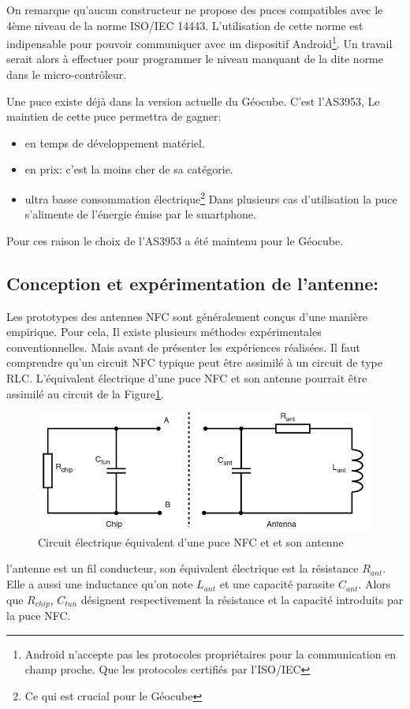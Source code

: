 \documentclass{themeensg}
\begin{document}
On remarque qu'aucun constructeur ne propose des puces compatibles avec le 4ème niveau de la norme ISO/IEC 14443. L'utilisation de cette norme est indipensable pour pouvoir communiquer avec un dispositif Android\footnote{Android n'accepte pas les protocoles propriétaires pour la communication en champ proche. Que les protocoles certifiés par l'ISO/IEC}. Un travail serait alors à effectuer pour programmer le niveau manquant de la dite norme dans le micro-contrôleur.

Une puce existe déjà dans la version actuelle du Géocube. C'est l'AS3953, Le maintien de cette puce permettra de gagner:
\begin{itemize}
\item en temps de développement matériel.
\item en prix: c'est la moins cher de sa catégorie.
\item ultra basse consommation électrique\footnote{Ce qui est crucial pour le Géocube} Dans plusieurs cas d'utilisation la puce s'alimente de l'énergie émise par le smartphone.
\end{itemize}
Pour ces raison le choix de l'AS3953 a été maintenu pour le Géocube.

\subsection{Conception et expérimentation de l'antenne:}

Les prototypes des antennes NFC sont généralement conçus d'une manière empirique. Pour cela, Il existe plusieurs méthodes expérimentales conventionnelles. Mais avant de présenter les expériences réalisées. Il faut comprendre qu'un circuit NFC typique peut être assimilé à un circuit de type RLC. L'équivalent électrique d'une puce NFC et son antenne pourrait être assimilé au circuit de la Figure\ref{fig:nfcandantenna}.

\begin{figure}[h!]
\centering
\label{fig:nfcandantenna}
\includegraphics[scale=0.5]{images/chipANDantenna.png}
\caption{Circuit électrique équivalent d'une puce NFC et et son antenne}
\end{figure}
l'antenne est un fil conducteur, son équivalent électrique est la résistance $R_{ant}$. Elle a aussi une inductance qu'on note $L_{ant}$ et une capacité parasite $C_{ant}$. Alors que $R_{chip}$, $C_{tun}$ désignent respectivement la résistance et la capacité introduits par la puce NFC.
\end{document}
